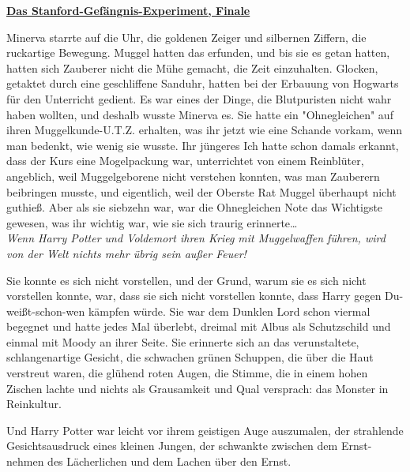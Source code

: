

\hypertarget{das-stanford-gefuxe4ngnis-experiment-finale}{%

\textbf{\uline{Das Stanford-Gefängnis-Experiment, Finale}}

Minerva starrte auf die Uhr, die goldenen Zeiger und silbernen Ziffern, die ruckartige Bewegung. Muggel hatten das erfunden, und bis sie es getan hatten, hatten sich Zauberer nicht die Mühe gemacht, die Zeit einzuhalten. Glocken, getaktet durch eine geschliffene Sanduhr, hatten bei der Erbauung von Hogwarts für den Unterricht gedient. Es war eines der Dinge, die Blutpuristen nicht wahr haben wollten, und deshalb wusste Minerva es. Sie hatte ein "Ohnegleichen" auf ihren Muggelkunde-U.T.Z. erhalten, was ihr jetzt wie eine Schande vorkam, wenn man bedenkt, wie wenig sie wusste. Ihr jüngeres Ich hatte schon damals erkannt, dass der Kurs eine Mogelpackung war, unterrichtet von einem Reinblüter, angeblich, weil Muggelgeborene nicht verstehen konnten, was man Zauberern beibringen musste, und eigentlich, weil der Oberste Rat Muggel überhaupt nicht guthieß. Aber als sie siebzehn war, war die Ohnegleichen Note das Wichtigste gewesen, was ihr wichtig war, wie sie sich traurig erinnerte…\\

\emph{Wenn Harry Potter und Voldemort ihren Krieg mit Muggelwaffen führen, wird von der Welt nichts mehr übrig sein außer Feuer!}

Sie konnte es sich nicht vorstellen, und der Grund, warum sie es sich nicht vorstellen konnte, war, dass sie sich nicht vorstellen konnte, dass Harry gegen Du-weißt-schon-wen kämpfen würde. Sie war dem Dunklen Lord schon viermal begegnet und hatte jedes Mal überlebt, dreimal mit Albus als Schutzschild und einmal mit Moody an ihrer Seite. Sie erinnerte sich an das verunstaltete, schlangenartige Gesicht, die schwachen grünen Schuppen, die über die Haut verstreut waren, die glühend roten Augen, die Stimme, die in einem hohen Zischen lachte und nichts als Grausamkeit und Qual versprach: das Monster in Reinkultur.

Und Harry Potter war leicht vor ihrem geistigen Auge auszumalen, der strahlende Gesichtsausdruck eines kleinen Jungen, der schwankte zwischen dem Ernst-nehmen des Lächerlichen und dem Lachen über den Ernst.

}
